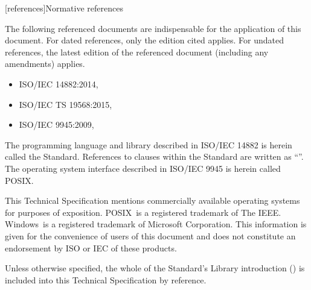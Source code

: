 
[references]{Normative references}

\pnum
The following referenced documents are indispensable for the application of this document. For dated references, only the edition cited applies. For undated references, the latest edition of the referenced document (including any amendments) applies.

\begin{itemize}
\item ISO/IEC 14882:2014, 
\item ISO/IEC TS 19568:2015, 
\item ISO/IEC 9945:2009, 
\end{itemize}

\pnum
The programming language and library described in ISO/IEC 14882 is herein called the \Cpp Standard.
References to clauses within the \Cpp Standard are written as ``''.
The operating system interface described in ISO/IEC 9945 is herein called POSIX.

\pnum
This Technical Specification mentions commercially available operating systems for purposes of exposition.  POSIX\textregistered\ is a registered trademark of The IEEE. Windows\textregistered\ is a registered trademark of Microsoft Corporation. This information is given for the convenience of users of this document and does not constitute an endorsement by ISO or IEC of these products.

\pnum
Unless otherwise specified, the whole of the \Cpp Standard's Library introduction () is included into this Technical Specification by reference.



